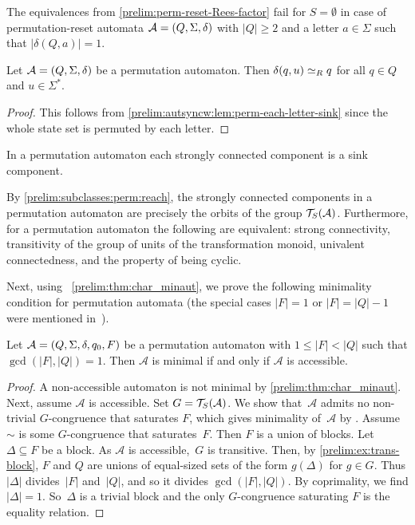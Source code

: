 The equivalences from \cref{prelim:perm-reset-Rees-factor} 
fail for $S = \emptyset$ in case of permutation-reset automata $\mathcal A = (Q, \Sigma, \delta)$
with $|Q| \ge 2$ and a letter $a \in \Sigma$ such that $|\delta(Q, a)| = 1$.

\begin{proposition} \label{prelim:subclasses:perm:reach} 
	Let $\mathcal A = (Q, \Sigma, \delta)$ be a permutation automaton.
	Then $\delta(q, u) \simeq_R q$ for all $q \in Q$
	and $u \in \Sigma^*$.		
\end{proposition}
\begin{proof}
	This follows from \cref{prelim:autsyncw:lem:perm-each-letter-sink} 
	since the whole state set is permuted by each letter.
\end{proof}

\begin{corollary} \label{prelim:subclasses:perm:reach:cor} 
	In a permutation automaton each strongly connected component is a sink component.
\end{corollary}

By \cref{prelim:subclasses:perm:reach}, the strongly connected components in a permutation automaton are precisely 
the orbits of the group $\mathcal T_S(\mathcal A)$.
Furthermore, for a permutation automaton 
the following are equivalent: strong connectivity, transitivity of the group of units of the transformation monoid,
univalent connectedness, and the property of being cyclic.


Next, using \THM~\ref{prelim:thm:char_minaut}, we prove the following
minimality condition for permutation automata (the special cases $|F| = 1$ or $|F| = |Q| - 1$
were mentioned in~\cite[Cor.~3.8]{DBLP:journals/mst/Davies18}).

\begin{proposition}
	\label{prelim:subclasses:prop:perm:min}
	Let $\mathcal A = (Q, \Sigma, \delta, q_0, F)$ be a permutation automaton with $1 \le |F| < |Q|$
	such that $\gcd(|F|, |Q|) = 1$.
	Then $\mathcal A$ is minimal %
	if and only if $\mathcal A$ is accessible.
\end{proposition}
\begin{proof}
	A non-accessible automaton is not minimal by \cref{prelim:thm:char_minaut}.
	Next, assume $\mathcal A$ is accessible.
	Set $G = \mathcal T_S(\mathcal A)$. 
	We show that~$\mathcal A$ admits no non-trivial $G$-congruence
	that saturates $F$, which gives minimality of~$\mathcal A$ 
	by .
	Assume~$\sim$ is some $G$-congruence that saturates~$F$.
	Then $F$ is a union of blocks. Let $\Delta \subseteq F$ be a block.
	As $\mathcal A$ is accessible,~$G$ 
	is transitive. Then, by \cref{prelim:ex:trans-block}, $F$
	and $Q$ are unions of equal-sized sets of the form $g(\Delta)$ for $g \in G$. 
	Thus $|\Delta|$ divides~$|F|$ and~$|Q|$, and so it divides $\gcd(|F|, |Q|)$.
	By coprimality, we find $|\Delta| = 1$. So~$\Delta$ is a trivial block
	and the only $G$-congruence saturating $F$ is the equality relation. 
\end{proof}

